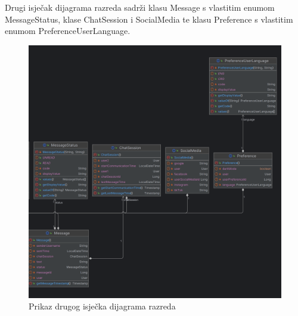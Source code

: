 Drugi isječak dijagrama razreda sadrži klasu Message s vlastitim enumom MessageStatus, klase ChatSession i SocialMedia te klasu Preference s vlastitim enumom PreferenceUserLanguage.
\begin{figure} [H]

	\includegraphics[width=1\linewidth]{slike/ClassDiagram2.png}
	\centering
	\caption{Prikaz drugog isječka dijagrama razreda}
	\label{fig:Prikaz drugog isječka dijagrama razreda}
\end{figure}

